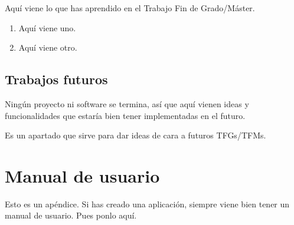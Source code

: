 \documentclass[a4paper, 12pt]{book}
\begin{document}
Aquí viene lo que has aprendido en el Trabajo Fin de Grado/Máster.

\begin{enumerate}
  \item Aquí viene uno.
  \item Aquí viene otro.
\end{enumerate}


\section{Trabajos futuros}
\label{sec:trabajos_futuros}

Ningún proyecto ni software se termina, así que aquí vienen ideas y funcionalidades que estaría bien tener implementadas en el futuro.

Es un apartado que sirve para dar ideas de cara a futuros TFGs/TFMs.



\cleardoublepage
\appendix
\chapter{Manual de usuario}
\label{app:manual}

Esto es un apéndice.
Si has creado una aplicación, siempre viene bien tener un manual de usuario.
Pues ponlo aquí.


\cleardoublepage


\end{document}
